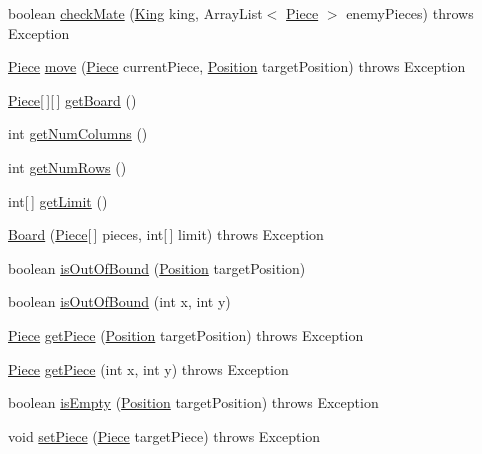 \begin{DoxyCompactItemize}
\item 
boolean \hyperlink{classBoard_1_1Board_a713aad08cb0666bf632cf2cf3447124f}{check\-Mate} (\hyperlink{classPiece_1_1Implementation_1_1King}{King} king, Array\-List$<$ \hyperlink{classPiece_1_1Piece}{Piece} $>$ enemy\-Pieces)  throws Exception 
\item 
\hyperlink{classPiece_1_1Piece}{Piece} \hyperlink{classBoard_1_1Board_a0950d74ea65b9e01a5a2169815e486d9}{move} (\hyperlink{classPiece_1_1Piece}{Piece} current\-Piece, \hyperlink{classUtil_1_1Position}{Position} target\-Position)  throws Exception 
\item 
\hyperlink{classPiece_1_1Piece}{Piece}\mbox{[}$\,$\mbox{]}\mbox{[}$\,$\mbox{]} \hyperlink{classBoard_1_1Board_ac153f5c0e83be18cec93e33078706076}{get\-Board} ()
\item 
int \hyperlink{classBoard_1_1Board_a98f46a8fba5082f562248f650f26c2ed}{get\-Num\-Columns} ()
\item 
int \hyperlink{classBoard_1_1Board_a25c2073838801fb0e52bd3916d7a9024}{get\-Num\-Rows} ()
\item 
int\mbox{[}$\,$\mbox{]} \hyperlink{classBoard_1_1Board_a491bcebbe369da000b951e706910f5bd}{get\-Limit} ()
\item 
\hyperlink{classBoard_1_1Board_a652faf97b9270325dfec42e9878dde03}{Board} (\hyperlink{classPiece_1_1Piece}{Piece}\mbox{[}$\,$\mbox{]} pieces, int\mbox{[}$\,$\mbox{]} limit)  throws Exception 
\item 
boolean \hyperlink{classBoard_1_1Board_aca3851cdb777a92a5cf7d2606f08a0b2}{is\-Out\-Of\-Bound} (\hyperlink{classUtil_1_1Position}{Position} target\-Position)
\item 
boolean \hyperlink{classBoard_1_1Board_aa3a97aabcffb32d0c8d93770002af58a}{is\-Out\-Of\-Bound} (int x, int y)
\item 
\hyperlink{classPiece_1_1Piece}{Piece} \hyperlink{classBoard_1_1Board_a86de1febbcfdc2ea7ccaef4dd00d1d9d}{get\-Piece} (\hyperlink{classUtil_1_1Position}{Position} target\-Position)  throws Exception 
\item 
\hyperlink{classPiece_1_1Piece}{Piece} \hyperlink{classBoard_1_1Board_a98f33996099296400eea798e545174b3}{get\-Piece} (int x, int y)  throws Exception 
\item 
boolean \hyperlink{classBoard_1_1Board_a0cbc00ef5292278d7e1ae004762d3e11}{is\-Empty} (\hyperlink{classUtil_1_1Position}{Position} target\-Position)  throws Exception 
\item 
void \hyperlink{classBoard_1_1Board_aec610c37f3e800806daa464a45b48762}{set\-Piece} (\hyperlink{classPiece_1_1Piece}{Piece} target\-Piece)  throws Exception 

\end{DoxyCompactItemize}
